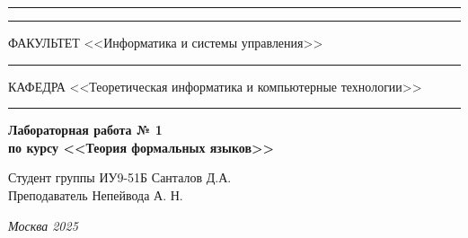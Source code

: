 \documentclass[a4paper, 14pt]{extarticle}
\begin{document}
\begin{titlepage}
\vspace{-25pt}
\hspace{-35pt}\rule{\textwidth}{2.3pt}

\vspace*{-20.3pt}
\hspace{-35pt}\rule{\textwidth}{0.4pt}

\vspace{1.5ex}
\hspace{-35pt} \noindent \small ФАКУЛЬТЕТ\hspace{80pt} <<Информатика и системы управления>>

\vspace*{-16pt}
\hspace{47pt}\rule{0.83\textwidth}{0.4pt}

\vspace{0.5ex}
\hspace{-35pt} \noindent \small КАФЕДРА\hspace{50pt} <<Теоретическая информатика и компьютерные технологии>>

\vspace*{-16pt}
\hspace{30pt}\rule{0.866\textwidth}{0.4pt}
  
\vspace{11em}

\begin{center}
\Large {\bf Лабораторная работа № 1} \\ 
\large {\bf по курсу <<Теория формальных языков>>} \\
\end{center}\normalsize

\vspace{8em}


\begin{flushright}
  {Студент группы ИУ9-51Б Санталов Д.А. \hspace*{15pt}\\ 
  \vspace{2ex}
  Преподаватель Непейвода А. Н.\hspace*{15pt}}
\end{flushright}

\bigskip

\vfill
 

\begin{center}
\textsl{Москва 2025}
\end{center}
\end{titlepage}
\end{document}
